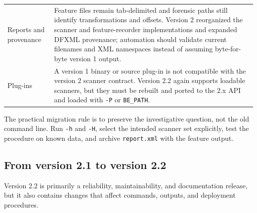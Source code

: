 \documentclass[11pt]{article}
\newcommand{\code}[1]{\texttt{#1}}
\begin{document}
\begin{longtable}{p{.25\linewidth}p{.69\linewidth}}
Reports and provenance & Feature files remain tab-delimited and forensic
paths still identify transformations and offsets. Version 2 reorganized the
scanner and feature-recorder implementations and expanded DFXML provenance;
automation should validate current filenames and XML namespaces instead of
assuming byte-for-byte version 1 output. \\

Plug-ins & A version 1 binary or source plug-in is not compatible with the
version 2 scanner contract. Version 2.2 again supports loadable scanners, but
they must be rebuilt and ported to the 2.x API and loaded with \code{-P} or
\code{BE\_PATH}. \\
\bottomrule
\end{longtable}

The practical migration rule is to preserve the investigative question, not
the old command line. Run \code{-h} and \code{-H}, select the intended scanner
set explicitly, test the procedure on known data, and archive \code{report.xml}
with the feature output.

\subsection{From version 2.1 to version 2.2}

Version 2.2 is primarily a reliability, maintainability, and documentation
release, but it also contains changes that affect commands, outputs, and
deployment procedures.
\end{document}
